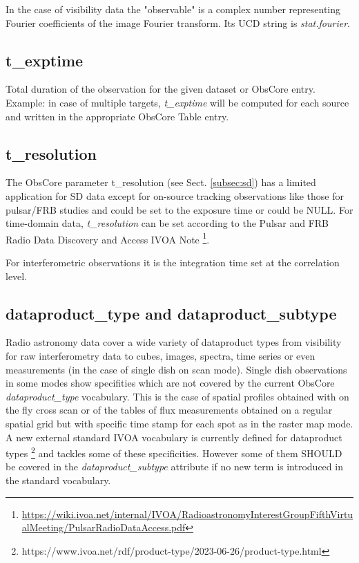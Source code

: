 \documentclass[11pt,a4paper]{ivoa}
\begin{document}
In the case of visibility data the "observable" is a complex number representing Fourier
coefficients of the image Fourier transform. Its UCD string is \emph{stat.fourier}.

\subsection{t\_exptime}
Total duration of the observation for the given dataset or ObsCore entry. Example: in case of multiple targets, \emph{t\_exptime}
will be computed for each source and written in the appropriate ObsCore Table entry.



\subsection{t\_resolution}
The ObsCore parameter t\_resolution (see Sect. \ref{subsec:sd}) has a limited application for SD data
except for on-source tracking observations like those for pulsar/FRB studies and could be set to the
exposure time or could be NULL. For time-domain data, \emph{t\_resolution} can be set according to the Pulsar
and FRB Radio Data Discovery and Access IVOA Note \footnote{\url{https://wiki.ivoa.net/internal/IVOA/RadioastronomyInterestGroupFifthVirtualMeeting/PulsarRadioDataAccess.pdf}}.

For interferometric observations it is the integration time set at the correlation level.


\subsection{dataproduct\_type and dataproduct\_subtype}

Radio astronomy data cover a wide variety of dataproduct types from visibility for raw interferometry data to cubes, images, spectra, time series
or even measurements (in the case of single dish on scan mode). Single dish observations in some modes show specifities which are not covered by
the current ObsCore \emph{dataproduct\_type} vocabulary. This is the case of spatial profiles obtained with on the fly cross scan or of the
tables of flux measurements obtained on a regular spatial grid but with specific time stamp for each spot as in the raster map  mode.
A new external standard IVOA vocabulary is currently defined for dataproduct types \footnote{https://www.ivoa.net/rdf/product-type/2023-06-26/product-type.html}
and tackles some of these specificities. However some of them SHOULD be covered in the \emph{dataproduct\_subtype} attribute if no new term is introduced in the standard vocabulary.
\end{document}
